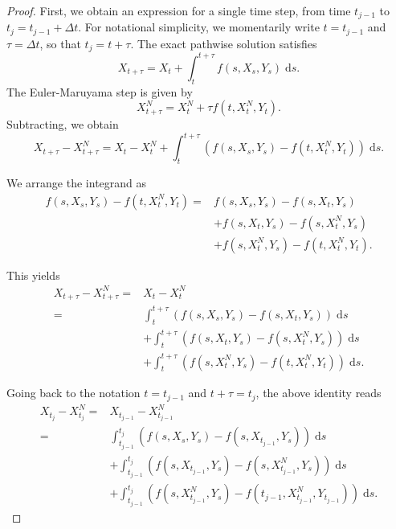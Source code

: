 \documentclass[reqno,12pt]{amsart}
\theoremstyle{plain}%
\theoremstyle{definition}
\begin{document}
\begin{proof}
First, we obtain an expression for a single time step, from time $t_{j-1}$ to $t_j = t_{j-1} + \Delta t$. For notational simplicity, we momentarily write $t = t_{j-1}$ and $\tau = \Delta t$, so that $t_j = t + \tau$. The exact pathwise solution satisfies
$$
X_{t + \tau} = X_t + \int_t^{t + \tau} f(s, X_s, Y_s) \;\mathrm{d}s.
$$
The Euler-Maruyama step is given by
$$
X_{t+\tau}^N = X_t^N + \tau f(t, X_t^N, Y_t).
$$
Subtracting, we obtain
$$
X_{t + \tau} - X_{t + \tau}^N = X_t - X_t^N + \int_t^{t + \tau} \left( f(s, X_s, Y_s) - f(t, X_t^N, Y_t) \right)\;\mathrm{d}s.
$$

We arrange the integrand as
\begin{align*}
f(s, X_s, Y_s) - f(t, X_t^N, Y_t) = & f(s, X_s, Y_s) - f(s, X_t, Y_s) \\ 
 & + f(s, X_t, Y_s) - f(s, X_t^N, Y_s) \\
 & + f(s, X_t^N, Y_s) - f(t, X_t^N, Y_t).
\end{align*}

This yields
\begin{align*}
    X_{t + \tau} - X_{t + \tau}^N  = & X_t - X_t^N \\
    = &  \int_t^{t + \tau} \left( f(s, X_s, Y_s) - f(s, X_t, Y_s) \right)\;\mathrm{d}s \\ 
    & + \int_t^{t + \tau} \left( f(s, X_t, Y_s) - f(s, X_t^N, Y_s) \right)\;\mathrm{d}s \\
    & + \int_t^{t + \tau} \left( f(s, X_t^N, Y_s) - f(t, X_t^N, Y_t) \right)\;\mathrm{d}s.
\end{align*}

Going back to the notation $t = t_{j-1}$ and $t + \tau = t_j$, the above identity reads
\begin{equation}
    \label{singlestep}
    \begin{aligned}
        X_{t_j} - X_{t_j}^N  = & X_{t_{j-1}} - X_{t_{j-1}}^N \\
        = &  \int_{t_{j-1}}^{t_j} \left( f(s, X_s, Y_s) - f(s, X_{t_{j-1}}, Y_s) \right)\;\mathrm{d}s \\ 
        & + \int_{t_{j-1}}^{t_j} \left( f(s, X_{t_{j-1}}, Y_s) - f(s, X_{t_{j-1}}^N, Y_s) \right)\;\mathrm{d}s \\
        & + \int_{t_{j-1}}^{t_j} \left( f(s, X_{t_{j-1}}^N, Y_s) - f(t_{j-1}, X_{t_{j-1}}^N, Y_{t_{j-1}}) \right)\;\mathrm{d}s.
    \end{aligned}
\end{equation}


\end{proof}
\end{document}
